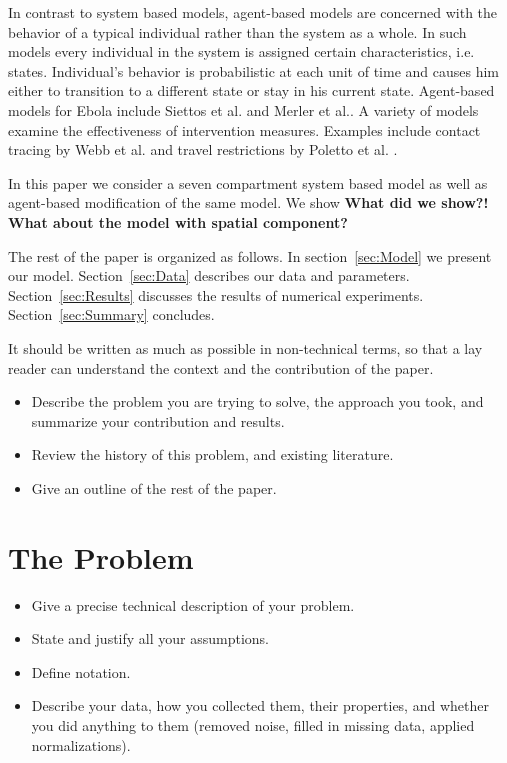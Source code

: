 \documentclass[10pt]{article}
\begin{document}
In contrast to system based models, agent-based models are concerned with the behavior of a typical individual rather than the system as a whole. In such models every individual in the system is assigned certain characteristics, i.e. states. Individual's behavior is probabilistic at each unit of time and causes him either to transition to a different state or stay in his current state. Agent-based models for Ebola include Siettos et al. \cite{Siettos2015} and Merler et al.\cite{Merler2015}. A variety of models examine the effectiveness of intervention measures. Examples include contact tracing by Webb et al. \cite{Webb2015} and travel restrictions by Poletto et al. \cite{Poletto2014}.

In this paper we consider a seven compartment system based model as well as agent-based modification of the same model. We show \textbf{What did we show?!} \textbf{What about the model with spatial component?}

The rest of the paper is organized as follows. In section~\ref{sec:Model} we present our model. Section~\ref{sec:Data} describes our data and parameters. Section~\ref{sec:Results} discusses the results of numerical experiments. Section~\ref{sec:Summary} concludes.

It should be written as much as possible in non-technical terms, so that a
lay reader can understand the context and the contribution of the paper.

\begin{itemize}
\item Describe the problem you are trying to solve, the approach
you took, and summarize your contribution and results.

\item Review the history of this problem, and existing literature.

\item Give an outline of the rest of the paper.
\end{itemize}


\section{The Problem}
\begin{itemize}
\item Give a precise technical description of your problem. 

\item State and justify all your assumptions. 

\item Define notation. 

\item Describe your data, how you collected them, their properties,
and whether you did 
anything to them (removed noise, filled in missing data, 
applied normalizations).
\end{itemize}
%
%
%
%
%
%
%
%
%
\end{document}
